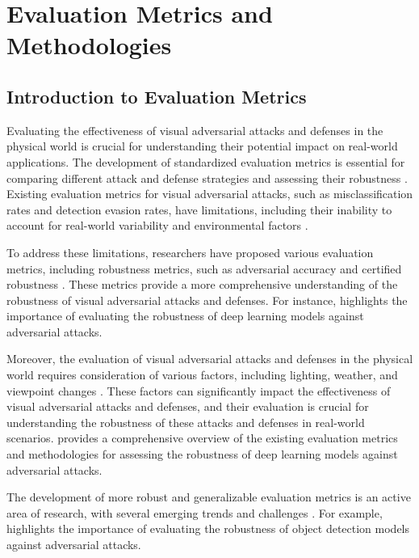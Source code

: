 \documentclass[11pt,a4paper]{article}
\begin{document}
\section{Evaluation Metrics and Methodologies}



\subsection{Introduction to Evaluation Metrics}


Evaluating the effectiveness of visual adversarial attacks and defenses in the physical world is crucial for understanding their potential impact on real-world applications. The development of standardized evaluation metrics is essential for comparing different attack and defense strategies and assessing their robustness \cite{doi:10.1145/3128572.3140444}. Existing evaluation metrics for visual adversarial attacks, such as misclassification rates and detection evasion rates, have limitations, including their inability to account for real-world variability and environmental factors \cite{arxiv:1707.08945}. 

To address these limitations, researchers have proposed various evaluation metrics, including robustness metrics, such as adversarial accuracy and certified robustness \cite{arxiv:1902.06705}. These metrics provide a more comprehensive understanding of the robustness of visual adversarial attacks and defenses. For instance, \cite{arxiv:1810.00069} highlights the importance of evaluating the robustness of deep learning models against adversarial attacks. 

Moreover, the evaluation of visual adversarial attacks and defenses in the physical world requires consideration of various factors, including lighting, weather, and viewpoint changes \cite{doi:10.1109/tnnls.2023.3321432}. These factors can significantly impact the effectiveness of visual adversarial attacks and defenses, and their evaluation is crucial for understanding the robustness of these attacks and defenses in real-world scenarios. \cite{doi:10.1109/access.2022.3216291} provides a comprehensive overview of the existing evaluation metrics and methodologies for assessing the robustness of deep learning models against adversarial attacks. 

The development of more robust and generalizable evaluation metrics is an active area of research, with several emerging trends and challenges \cite{doi:10.58496/adsa/2024/011}. For example, \cite{doi:10.1109/tnnls.2025.3561225} highlights the importance of evaluating the robustness of object detection models against adversarial attacks. 
\end{document}
